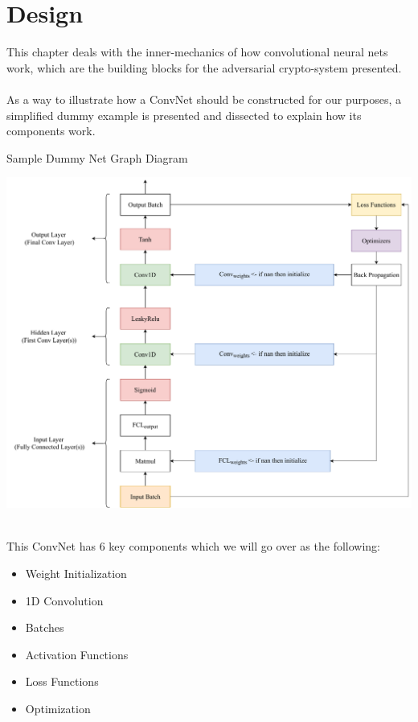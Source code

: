 \documentclass[a4paper, 12pt]{report}
\begin{document}
\chapter{Design}\label{sec:design}
This chapter deals with the inner-mechanics of how convolutional neural nets work, which are the building blocks for the adversarial crypto-system presented.\\\\
As a way to illustrate how a ConvNet should be constructed for our purposes, a simplified dummy example is presented and dissected to explain how its components work.\\
\begin{blockfigure}{Sample Dummy Net Graph Diagram}
	\begin{center}
		\includegraphics[height = 0.45\textheight]{SimpleNetDiagram}
		\label{fig:SimpleNetDiagram}
	\end{center}
\end{blockfigure}\\
This ConvNet has 6 key components which we will go over as the following:
\begin{itemize}[nosep]
	\item Weight Initialization
	\item 1D Convolution
	\item Batches
	\item Activation Functions
	\item Loss Functions
	\item Optimization
\end{itemize}
\newpage
\end{document}
